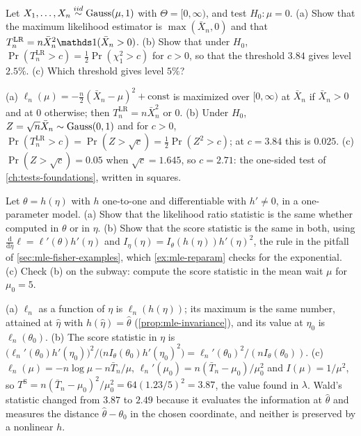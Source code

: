 \begin{exercise}
\label{ex:wlr-boundary}
Let $X_1, \ldots, X_n \stackrel{iid}{\sim} \text{Gauss}(\mu, 1)$ with $\Theta = [0, \infty)$, and test $H_0: \mu = 0$. (a) Show that the maximum likelihood estimator is $\max(\bar{X}_n, 0)$ and that $T^{\mathrm{LR}}_n = n\bar{X}_n^2\ind(\bar{X}_n > 0)$. (b) Show that under $H_0$, $\Pr(T^{\mathrm{LR}}_n > c) = \frac12\Pr(\chi^2_1 > c)$ for $c > 0$, so that the threshold $3.84$ gives level $2.5\%$. (c) Which threshold gives level $5\%$?
\end{exercise}
\begin{solution}
(a) $\ell_n(\mu) = -\frac{n}{2}(\bar{X}_n - \mu)^2 + \text{const}$ is maximized over $[0, \infty)$ at $\bar{X}_n$ if $\bar{X}_n > 0$ and at $0$ otherwise; then $T^{\mathrm{LR}}_n = n\bar{X}_n^2$ or $0$. (b) Under $H_0$, $Z = \sqrt{n}\bar{X}_n \sim \text{Gauss}(0, 1)$ and for $c > 0$, $\Pr(T^{\mathrm{LR}}_n > c) = \Pr(Z > \sqrt{c}) = \frac12\Pr(Z^2 > c)$; at $c = 3.84$ this is $0.025$. (c) $\Pr(Z > \sqrt{c}) = 0.05$ when $\sqrt{c} = 1.645$, so $c = 2.71$: the one-sided test of \cref{ch:tests-foundations}, written in squares.
\end{solution}

\begin{exercise}
\label{ex:wlr-invariance}
Let $\theta = h(\eta)$ with $h$ one-to-one and differentiable with $h' \neq 0$, in a one-parameter model. (a) Show that the likelihood ratio statistic is the same whether computed in $\theta$ or in $\eta$. (b) Show that the score statistic is the same in both, using $\frac{\mathrm{d}}{\mathrm{d}\eta}\ell = \ell'(\theta)h'(\eta)$ and $I_\eta(\eta) = I_\theta(h(\eta))h'(\eta)^2$, the rule in the pitfall of \cref{sec:mle-fisher-examples}, which \cref{ex:mle-reparam} checks for the exponential. (c) Check (b) on the subway: compute the score statistic in the mean wait $\mu$ for $\mu_0 = 5$.
\end{exercise}
\begin{solution}
(a) $\ell_n$ as a function of $\eta$ is $\ell_n(h(\eta))$; its maximum is the same number, attained at $\hat{\eta}$ with $h(\hat{\eta}) = \hat{\theta}$ (\cref{prop:mle-invariance}), and its value at $\eta_0$ is $\ell_n(\theta_0)$. (b) The score statistic in $\eta$ is $\big(\ell_n'(\theta_0)h'(\eta_0)\big)^2/\big(nI_\theta(\theta_0)h'(\eta_0)^2\big) = \ell_n'(\theta_0)^2/(nI_\theta(\theta_0))$. (c) $\ell_n(\mu) = -n\log\mu - n\bar{T}_n/\mu$, $\ell_n'(\mu_0) = n(\bar{T}_n - \mu_0)/\mu_0^2$ and $I(\mu) = 1/\mu^2$, so $T^{\mathrm{S}} = n(\bar{T}_n - \mu_0)^2/\mu_0^2 = 64(1.23/5)^2 = 3.87$, the value found in $\lambda$. Wald's statistic changed from $3.87$ to $2.49$ because it evaluates the information at $\hat{\theta}$ and measures the distance $\hat{\theta} - \theta_0$ in the chosen coordinate, and neither is preserved by a nonlinear $h$.
\end{solution}

